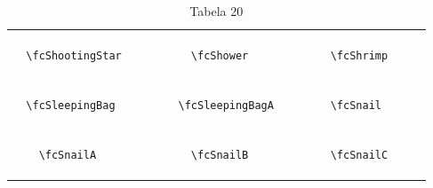\documentclass[x11names]{article}
\begin{document}
\begin{table}[H]
\begin{tabular}{|c|c|c|c|c|c|}
		&\multirow{5}{*}{	\fcShootingStar	[scale=0.36]} & &\multirow{5}{*}{	\fcShower	[scale=0.16]} & &\multirow{5}{*}{	\fcShrimp	[scale=0.16]}\\	& & & & & \\	& & & & & \\	\verb|	\fcShootingStar	| & & \verb|	\fcShower	| & & \verb|	\fcShrimp	| & \\	& & & & & \\	& & & & & \\	& & & & & \\	\hline									
		&\multirow{5}{*}{	\fcSleepingBag	[scale=0.16]} & &\multirow{5}{*}{	\fcSleepingBagA	[scale=0.16]} & &\multirow{5}{*}{	\fcSnail	[scale=0.16]}\\	& & & & & \\	& & & & & \\	\verb|	\fcSleepingBag	| & & \verb|	\fcSleepingBagA	| & & \verb|	\fcSnail	| & \\	& & & & & \\	& & & & & \\	& & & & & \\	\hline									
		&\multirow{5}{*}{	\fcSnailA	[scale=0.16]} & &\multirow{5}{*}{	\fcSnailB	[scale=0.16]} & &\multirow{5}{*}{	\fcSnailC	[scale=0.16]}\\	& & & & & \\	& & & & & \\	\verb|	\fcSnailA	| & & \verb|	\fcSnailB	| & & \verb|	\fcSnailC	| & \\	& & & & & \\	& & & & & \\	& & & & & \\		\hline 	\hline 	\end{tabular}	\caption{	Tabela 20	}\label{	Tab20	}\end{table}
\end{document}
